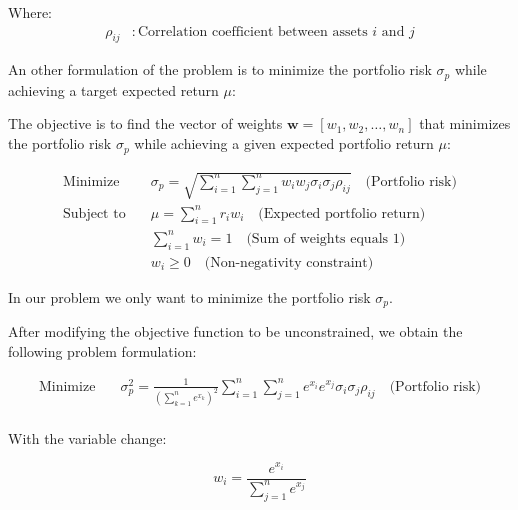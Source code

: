 \documentclass[12pt]{article}
\begin{document}
Where:
\begin{align*}
    \rho_{ij} & : \text{Correlation coefficient between assets } i \text{ and } j
\end{align*}


An other formulation of the problem is to minimize the portfolio risk $\sigma_p$ while achieving a target expected return $\mu$:

The objective is to find the vector of weights $\mathbf{w} = [w_1, w_2, \ldots, w_n]$ that minimizes the portfolio risk $\sigma_p$ while achieving a given expected portfolio return $\mu$:

\begin{equation}
    \begin{aligned}
        \text{Minimize} \quad   & \sigma_p = \sqrt{\sum_{i=1}^{n}\sum_{j=1}^{n} w_i w_j \sigma_i \sigma_j \rho_{ij}} \quad \text{(Portfolio risk)} \\
        \text{Subject to} \quad & \mu = \sum_{i=1}^{n} r_i w_i \quad \text{(Expected portfolio return)}                                             \\
                                & \sum_{i=1}^{n} w_i = 1 \quad \text{(Sum of weights equals 1)}                                                        \\
                                & w_i \geq 0 \quad \text{(Non-negativity constraint)}
    \end{aligned}
\end{equation}


In our problem we only want to minimize the portfolio risk $\sigma_p$.

After modifying the objective function to be unconstrained, we obtain the following problem formulation:

\begin{equation}
    \begin{aligned}
        \text{Minimize} \quad   & \sigma_p^2 = \frac{1}{(\sum_{k=1}^{n} e^{x_k})^{2}} \sum_{i=1}^{n}\sum_{j=1}^{n} e^{x_i} e^{x_j}\sigma_i \sigma_j \rho_{ij} \quad \text{(Portfolio risk)} \\
    \end{aligned}
\end{equation}

With the variable change:

\begin{equation}
    w_i = \frac{e^{x_i}}{\sum_{j=1}^{n} e^{x_j}}
\end{equation}
\end{document}
